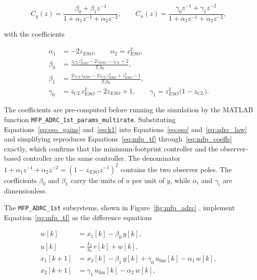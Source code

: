 \begin{equation}
	C_y(z) = \frac{\beta_0 + \beta_1 z^{-1}}{1 + \alpha_1 z^{-1} + \alpha_2 z^{-2}},
	\qquad
	C_u(z) = \frac{\gamma_0 z^{-1} + \gamma_1 z^{-2}}{1 + \alpha_1 z^{-1} + \alpha_2 z^{-2}},
	\label{eq:mfp_cy_cu}
\end{equation}

with the coefficients

\begin{equation}
	\begin{aligned}
		\alpha_1 &= -2 z_{ESO}, \qquad \alpha_2 = z_{ESO}^{2}, \\
		\beta_0 &= \frac{z_{CL} z_{ESO}^{2} - 2 z_{ESO} - z_{CL} + 2}{T_s b_0}, \\
		\beta_1 &= \frac{2 z_{CL} z_{ESO} - 2 z_{CL} z_{ESO}^{2} + z_{ESO}^{2} - 1}{T_s b_0}, \\
		\gamma_0 &= z_{CL} z_{ESO}^{2} - 2 z_{ESO} + 1, \qquad
		\gamma_1 = z_{ESO}^{2} \big( 1 - z_{CL} \big).
	\end{aligned}
	\label{eq:mfp_coeffs}
\end{equation}

The coefficients are pre-computed before running the simulation by the MATLAB function \texttt{MFP\_ADRC\_1st\_\allowbreak params\_\allowbreak multirate}. Substituting Equations~\eqref{eq:eso_gains} and~\eqref{eq:k1} into Equations~\eqref{eq:eso} and~\eqref{eq:adrc_law} and simplifying reproduces Equations~\eqref{eq:mfp_tf} through~\eqref{eq:mfp_coeffs} exactly, which confirms that the minimum-footprint controller and the observer-based controller are the same controller. The denominator
$1 + \alpha_1 z^{-1} + \alpha_2 z^{-2} = (1 - z_{ESO} z^{-1})^{2}$ contains the two observer poles. The coefficients $\beta_0$ and $\beta_1$ carry the units of $u$ per unit of $y$, while $\alpha_i$ and $\gamma_i$ are dimensionless.

The \texttt{MFP\_ADRC\_1st} subsystems, shown in Figure~\ref{fig:mfp_adrc} %
, implement Equation~\eqref{eq:mfp_tf} as the difference equations

\begin{equation}
	\begin{aligned}
		w[k] &= x_1[k] - \beta_0\, y[k], \\
		u[k] &= \frac{k_1}{b_0}\, r[k] + w[k], \\
		x_1[k+1] &= x_2[k] - \beta_1\, y[k] + \gamma_0\, u_{\mathrm{lim}}[k] - \alpha_1\, w[k], \\
		x_2[k+1] &= \gamma_1\, u_{\mathrm{lim}}[k] - \alpha_2\, w[k],
	\end{aligned}
	\label{eq:mfp_difference}
\end{equation}

